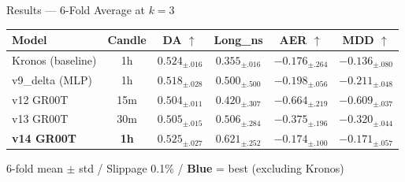 \documentclass[aspectratio=169,11pt]{beamer}
\newcommand{\best}[1]{\textcolor{bestcol}{\textbf{#1}}}
\begin{document}
\begin{frame}{Results --- 6-Fold Average at $k=3$}
  \begin{table}
    \centering
    \renewcommand{\arraystretch}{1.4}
    \setlength{\tabcolsep}{5pt}
    \begin{tabular}{lc cccc}
      \toprule
      \textbf{Model} & \textbf{Candle} &
        \textbf{DA} $\uparrow$ & \textbf{Long\_ns} &
        \textbf{AER} $\uparrow$ & \textbf{MDD} $\uparrow$ \\
      \midrule
      \rowcolor{rowgray}
      Kronos (baseline) & 1h &
        $0.524_{\pm.016}$ & $0.355_{\pm.016}$ &
        $-0.176_{\pm.264}$ & $-0.136_{\pm.080}$ \\
      v9\_delta (MLP) & 1h &
        $0.518_{\pm.028}$ & $0.500_{\pm.500}$ &
        $-0.198_{\pm.056}$ & $-0.211_{\pm.048}$ \\
      \rowcolor{rowgray}
      v12 GR00T & 15m &
        $0.504_{\pm.011}$ & $0.420_{\pm.307}$ &
        $-0.664_{\pm.219}$ & $-0.609_{\pm.037}$ \\
      v13 GR00T & 30m &
        $0.505_{\pm.015}$ & $0.506_{\pm.284}$ &
        $-0.375_{\pm.196}$ & $-0.320_{\pm.044}$ \\
      \rowcolor{rowgray}
      \textbf{v14 GR00T} & \textbf{1h} &
        \best{$0.525_{\pm.027}$} & $0.621_{\pm.252}$ &
        \best{$-0.174_{\pm.100}$} & \best{$-0.171_{\pm.057}$} \\
      \bottomrule
    \end{tabular}
    \par\vspace{0.3em}\centering\footnotesize 6-fold mean $\pm$ std / Slippage 0.1\% / \textcolor{bestcol}{\textbf{Blue}} = best (excluding Kronos)
  \end{table}
\end{frame}
\end{document}
